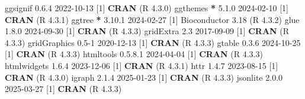 \documentclass[
]{article}
\newenvironment{Shaded}{\begin{snugshade}}{\end{snugshade}}
\newcommand{\DecValTok}[1]{\textcolor[rgb]{0.00,0.00,0.81}{#1}}
\newcommand{\FloatTok}[1]{\textcolor[rgb]{0.00,0.00,0.81}{#1}}
\newcommand{\FunctionTok}[1]{\textcolor[rgb]{0.13,0.29,0.53}{\textbf{#1}}}
\newcommand{\NormalTok}[1]{#1}
\newcommand{\SpecialCharTok}[1]{\textcolor[rgb]{0.81,0.36,0.00}{\textbf{#1}}}
\begin{document}
\begin{Shaded}
\begin{Highlighting}[]
\NormalTok{ ggsignif        }\DecValTok{0}\NormalTok{.}\FloatTok{6.4}   \DecValTok{2022{-}10{-}13}\NormalTok{ [}\DecValTok{1}\NormalTok{] }\FunctionTok{CRAN}\NormalTok{ (R }\DecValTok{4}\NormalTok{.}\FloatTok{3.0}\NormalTok{)}
\NormalTok{ ggthemes      }\SpecialCharTok{*} \DecValTok{5}\NormalTok{.}\FloatTok{1.0}   \DecValTok{2024{-}02{-}10}\NormalTok{ [}\DecValTok{1}\NormalTok{] }\FunctionTok{CRAN}\NormalTok{ (R }\DecValTok{4}\NormalTok{.}\FloatTok{3.1}\NormalTok{)}
\NormalTok{ ggtree        }\SpecialCharTok{*} \DecValTok{3}\NormalTok{.}\FloatTok{10.1}  \DecValTok{2024{-}02{-}27}\NormalTok{ [}\DecValTok{1}\NormalTok{] Bioconductor }\FloatTok{3.18}\NormalTok{ (R }\DecValTok{4}\NormalTok{.}\FloatTok{3.2}\NormalTok{)}
\NormalTok{ glue            }\DecValTok{1}\NormalTok{.}\FloatTok{8.0}   \DecValTok{2024{-}09{-}30}\NormalTok{ [}\DecValTok{1}\NormalTok{] }\FunctionTok{CRAN}\NormalTok{ (R }\DecValTok{4}\NormalTok{.}\FloatTok{3.3}\NormalTok{)}
\NormalTok{ gridExtra       }\FloatTok{2.3}     \DecValTok{2017{-}09{-}09}\NormalTok{ [}\DecValTok{1}\NormalTok{] }\FunctionTok{CRAN}\NormalTok{ (R }\DecValTok{4}\NormalTok{.}\FloatTok{3.3}\NormalTok{)}
\NormalTok{ gridGraphics    }\FloatTok{0.5}\DecValTok{{-}1}   \DecValTok{2020{-}12{-}13}\NormalTok{ [}\DecValTok{1}\NormalTok{] }\FunctionTok{CRAN}\NormalTok{ (R }\DecValTok{4}\NormalTok{.}\FloatTok{3.3}\NormalTok{)}
\NormalTok{ gtable          }\DecValTok{0}\NormalTok{.}\FloatTok{3.6}   \DecValTok{2024{-}10{-}25}\NormalTok{ [}\DecValTok{1}\NormalTok{] }\FunctionTok{CRAN}\NormalTok{ (R }\DecValTok{4}\NormalTok{.}\FloatTok{3.3}\NormalTok{)}
\NormalTok{ htmltools       }\DecValTok{0}\NormalTok{.}\DecValTok{5}\NormalTok{.}\FloatTok{8.1} \DecValTok{2024{-}04{-}04}\NormalTok{ [}\DecValTok{1}\NormalTok{] }\FunctionTok{CRAN}\NormalTok{ (R }\DecValTok{4}\NormalTok{.}\FloatTok{3.3}\NormalTok{)}
\NormalTok{ htmlwidgets     }\DecValTok{1}\NormalTok{.}\FloatTok{6.4}   \DecValTok{2023{-}12{-}06}\NormalTok{ [}\DecValTok{1}\NormalTok{] }\FunctionTok{CRAN}\NormalTok{ (R }\DecValTok{4}\NormalTok{.}\FloatTok{3.1}\NormalTok{)}
\NormalTok{ httr            }\DecValTok{1}\NormalTok{.}\FloatTok{4.7}   \DecValTok{2023{-}08{-}15}\NormalTok{ [}\DecValTok{1}\NormalTok{] }\FunctionTok{CRAN}\NormalTok{ (R }\DecValTok{4}\NormalTok{.}\FloatTok{3.0}\NormalTok{)}
\NormalTok{ igraph          }\DecValTok{2}\NormalTok{.}\FloatTok{1.4}   \DecValTok{2025{-}01{-}23}\NormalTok{ [}\DecValTok{1}\NormalTok{] }\FunctionTok{CRAN}\NormalTok{ (R }\DecValTok{4}\NormalTok{.}\FloatTok{3.3}\NormalTok{)}
\NormalTok{ jsonlite        }\DecValTok{2}\NormalTok{.}\FloatTok{0.0}   \DecValTok{2025{-}03{-}27}\NormalTok{ [}\DecValTok{1}\NormalTok{] }\FunctionTok{CRAN}\NormalTok{ (R }\DecValTok{4}\NormalTok{.}\FloatTok{3.3}\NormalTok{)}

\end{Highlighting}
\end{Shaded}
\end{document}
